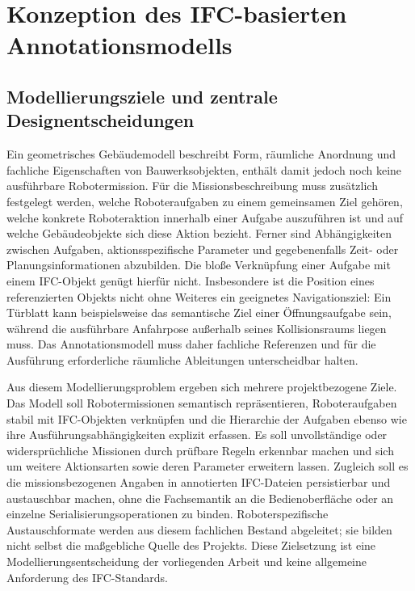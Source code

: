 \setcounter{section}{3}
\section{Konzeption des IFC-basierten Annotationsmodells}\label{sec:ifc-annotationsmodell}

\subsection{Modellierungsziele und zentrale Designentscheidungen}\label{subsec:modellierungsziele-annotationsmodell}

Ein geometrisches Gebäudemodell beschreibt Form, räumliche Anordnung und fachliche Eigenschaften von Bauwerksobjekten,
enthält damit jedoch noch keine ausführbare Robotermission. Für die Missionsbeschreibung muss zusätzlich festgelegt
werden, welche Roboteraufgaben zu einem gemeinsamen Ziel gehören, welche konkrete Roboteraktion innerhalb einer Aufgabe
auszuführen ist und auf welche Gebäudeobjekte sich diese Aktion bezieht. Ferner sind Abhängigkeiten zwischen Aufgaben,
aktionsspezifische Parameter und gegebenenfalls Zeit- oder Planungsinformationen abzubilden. Die bloße Verknüpfung einer
Aufgabe mit einem IFC-Objekt genügt hierfür nicht. Insbesondere ist die Position eines referenzierten Objekts nicht ohne
Weiteres ein geeignetes Navigationsziel: Ein Türblatt kann beispielsweise das semantische Ziel einer Öffnungsaufgabe
sein, während die ausführbare Anfahrpose außerhalb seines Kollisionsraums liegen muss. Das Annotationsmodell muss daher
fachliche Referenzen und für die Ausführung erforderliche räumliche Ableitungen unterscheidbar halten.

Aus diesem Modellierungsproblem ergeben sich mehrere projektbezogene Ziele. Das Modell soll Robotermissionen semantisch
repräsentieren, Roboteraufgaben stabil mit IFC-Objekten verknüpfen und die Hierarchie der Aufgaben ebenso wie ihre
Ausführungsabhängigkeiten explizit erfassen. Es soll unvollständige oder widersprüchliche Missionen durch prüfbare
Regeln erkennbar machen und sich um weitere Aktionsarten sowie deren Parameter erweitern lassen. Zugleich soll es die
missionsbezogenen Angaben in annotierten IFC-Dateien persistierbar und austauschbar machen, ohne die Fachsemantik an die
Bedienoberfläche oder an einzelne Serialisierungsoperationen zu binden. Roboterspezifische Austauschformate werden aus
diesem fachlichen Bestand abgeleitet; sie bilden nicht selbst die maßgebliche Quelle des Projekts. Diese Zielsetzung ist
eine Modellierungsentscheidung der vorliegenden Arbeit und keine allgemeine Anforderung des IFC-Standards.

